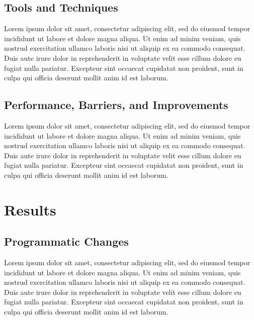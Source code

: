 \documentclass[a4paper,12pt]{article}
\theoremstyle{mytheor}
\begin{document}
        \subsection{Tools and Techniques}
            Lorem ipsum dolor sit amet, consectetur adipiscing elit, sed do eiusmod tempor incididunt ut labore et dolore magna aliqua. Ut enim ad minim veniam, quis nostrud exercitation ullamco laboris nisi ut aliquip ex ea commodo consequat. Duis aute irure dolor in reprehenderit in voluptate velit esse cillum dolore eu fugiat nulla pariatur. Excepteur sint occaecat cupidatat non proident, sunt in culpa qui officia deserunt mollit anim id est laborum.
        \subsection{Performance, Barriers, and Improvements}
            Lorem ipsum dolor sit amet, consectetur adipiscing elit, sed do eiusmod tempor incididunt ut labore et dolore magna aliqua. Ut enim ad minim veniam, quis nostrud exercitation ullamco laboris nisi ut aliquip ex ea commodo consequat. Duis aute irure dolor in reprehenderit in voluptate velit esse cillum dolore eu fugiat nulla pariatur. Excepteur sint occaecat cupidatat non proident, sunt in culpa qui officia deserunt mollit anim id est laborum.
    \pagebreak
    \section{Results}
        \subsection{Programmatic Changes}
        Lorem ipsum dolor sit amet, consectetur adipiscing elit, sed do eiusmod tempor incididunt ut labore et dolore magna aliqua. Ut enim ad minim veniam, quis nostrud exercitation ullamco laboris nisi ut aliquip ex ea commodo consequat. Duis aute irure dolor in reprehenderit in voluptate velit esse cillum dolore eu fugiat nulla pariatur. Excepteur sint occaecat cupidatat non proident, sunt in culpa qui officia deserunt mollit anim id est laborum.
\end{document}
